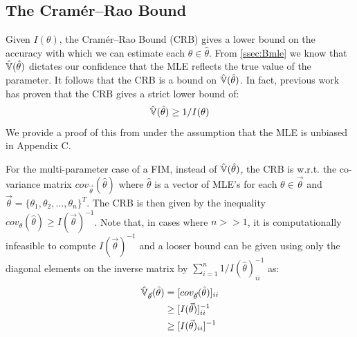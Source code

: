 \subsection{The Cramér–Rao Bound}
\label{ssec:Bcrb}
Given $I(\theta)$, the Cramér–Rao Bound (CRB) gives a lower bound on the accuracy with which we can estimate each $\theta\in\hat\theta$. From \cref{ssec:Bmle} we know that $\operatorname{\hat{\mathbb{V}}}(\hat\theta)$ dictates our confidence that the MLE reflects the true value of the parameter. It follows that the CRB is a bound on $\operatorname{\hat{\mathbb{V}}}(\hat\theta)$. In fact, previous work has proven that the CRB gives a strict lower bound of:
\begin{equation*}
    \operatorname{\hat{\mathbb{V}}}(\hat\theta) \geq 1/I(\theta)
\end{equation*}
\noindent We provide a proof of this from \cite{trees_detection_2013} under the assumption that the MLE is unbiased in Appendix C.\par
For the multi-parameter case of a FIM, instead of $\operatorname{\hat{\mathbb{V}}}(\hat\theta)$, the CRB is w.r.t. the co-variance matrix $cov_{\vec{\theta}}(\hat\theta)$ where $\hat\theta$ is a vector of MLE's for each $\theta\in\vec{\theta}$ and $\vec{\theta}=\{\theta_1,\theta_2,\ldots,\theta_n\}^T$. The CRB is then given by the inequality $cov_\theta(\hat\theta)\geq I(\vec{\theta})^{-1}$. Note that, in cases where $n>>1$, it is computationally infeasible to compute $I(\vec{\theta})^{-1}$ and a looser bound can be given using only the diagonal elements on the inverse matrix by $\sum_{i=1}^n 1/I(\hat\theta)_{ii}^{-1}$ as:
\begin{align*}
    \operatorname{\hat{\mathbb{V}}}_{\vec{\theta}}(\hat\theta) &= [cov_{\vec{\theta}}(\hat\theta)]_{ii}\\
    &\geq [I(\vec{\theta})]^{-1}_{ii}\\
    &\geq [I(\vec{\theta})_{ii}]^{-1}
\end{align*}

